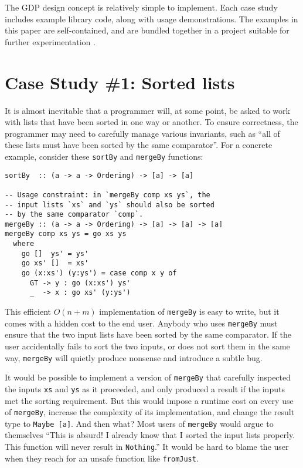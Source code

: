 \documentclass[format=sigplan, review=false, screen=true]{acmart}
\begin{document}
The GDP design concept is relatively simple to implement. Each case study includes example library code,
along with usage demonstrations. The examples in this paper are self-contained, and are bundled together in
a project suitable for further experimentation \cite{this}.


\section{Case Study \#1: Sorted lists}

It is almost inevitable that a programmer will, at some point, be asked to work
with lists that have been sorted in one way or another. To ensure correctness,
the programmer may need to carefully manage various invariants, such
as ``all of these lists must have been sorted by the same comparator''. For a concrete
example, consider these \texttt{sortBy} and \texttt{mergeBy} functions:
\begin{verbatim}
sortBy  :: (a -> a -> Ordering) -> [a] -> [a]

-- Usage constraint: in `mergeBy comp xs ys`, the
-- input lists `xs` and `ys` should also be sorted
-- by the same comparator `comp`.
mergeBy :: (a -> a -> Ordering) -> [a] -> [a] -> [a]
mergeBy comp xs ys = go xs ys
  where
    go []  ys' = ys'
    go xs' []  = xs'
    go (x:xs') (y:ys') = case comp x y of
      GT -> y : go (x:xs') ys'
      _  -> x : go xs' (y:ys')
\end{verbatim}
This efficient $O(n+m)$ implementation of \texttt{mergeBy} is easy to write,
but it comes with a hidden cost to the end user. Anybody who uses \texttt{mergeBy}
must ensure that the two input lists have been sorted by the same comparator.
If the user accidentally fails to sort the two inputs, or does not sort them in the same way,
\texttt{mergeBy} will quietly produce nonsense and introduce a subtle bug.

It would be possible to implement a version of \texttt{mergeBy} that
carefully inspected the inputs \texttt{xs} and \texttt{ys} as it
proceeded, and only produced a result if the inputs met the sorting
requirement. But this would impose a runtime cost on every use of
\texttt{mergeBy}, increase the complexity of its implementation,
and change the result type to \texttt{Maybe [a]}. And then what?
Most users of \texttt{mergeBy} would argue to themselves ``This is
absurd! I already know that I sorted the input lists properly. This
function will never result in \texttt{Nothing}.'' It would be hard
to blame the user when they reach for an  unsafe function like
\texttt{fromJust}.
\end{document}
